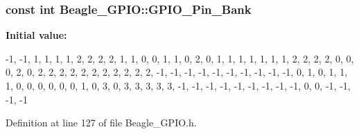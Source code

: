 \hypertarget{class_beagle___g_p_i_o_ae7919c981429a17c48c601664a61d64a}{
\subsubsection[{\-G\-P\-I\-O\-\_\-\-Pin\-\_\-\-Bank}]{\setlength{\rightskip}{0pt plus 5cm}const int {\bf \-Beagle\-\_\-\-G\-P\-I\-O\-::\-G\-P\-I\-O\-\_\-\-Pin\-\_\-\-Bank}}}\label{class_beagle___g_p_i_o_ae7919c981429a17c48c601664a61d64a}
{\bfseries \-Initial value\-:}
\begin{DoxyCode}
 
{
        -1, -1,  1,  1,  1,     
         1,  2,  2,  2,  2,     
         1,  1,  0,  0,  1,     
         1,  0,  2,  0,  1,     
         1,  1,  1,  1,  1,     
         1,  2,  2,  2,  2,     
         0,  0,  0,  2,  0,     
         2,  2,  2,  2,  2,     
         2,  2,  2,  2,  2,     
         2,                     
        -1, -1, -1, -1, -1,     
        -1, -1, -1, -1, -1,     
         0,  1,  0,  1,  1,     
         1,  0,  0,  0,  0,     
         0,  0,  1,  0,  3,     
         0,  3,  3,  3,  3,     
         3, -1, -1, -1, -1,     
        -1, -1, -1, -1, -1,     
         0,  0, -1, -1, -1,     
        -1                      
}
\end{DoxyCode}


\-Definition at line 127 of file \-Beagle\-\_\-\-G\-P\-I\-O.\-h.


